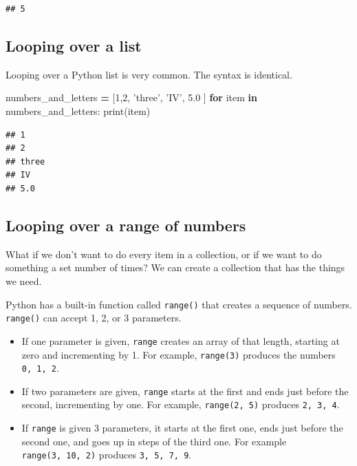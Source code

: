 \documentclass[]{book}
\newenvironment{Shaded}{\begin{snugshade}}{\end{snugshade}}
\newcommand{\BuiltInTok}[1]{#1}
\newcommand{\ControlFlowTok}[1]{\textcolor[rgb]{0.13,0.29,0.53}{\textbf{#1}}}
\newcommand{\DecValTok}[1]{\textcolor[rgb]{0.00,0.00,0.81}{#1}}
\newcommand{\FloatTok}[1]{\textcolor[rgb]{0.00,0.00,0.81}{#1}}
\newcommand{\KeywordTok}[1]{\textcolor[rgb]{0.13,0.29,0.53}{\textbf{#1}}}
\newcommand{\NormalTok}[1]{#1}
\newcommand{\OperatorTok}[1]{\textcolor[rgb]{0.81,0.36,0.00}{\textbf{#1}}}
\newcommand{\StringTok}[1]{\textcolor[rgb]{0.31,0.60,0.02}{#1}}
\providecommand{\tightlist}{%
  \setlength{\itemsep}{0pt}\setlength{\parskip}{0pt}}
\theoremstyle{definition}
\theoremstyle{definition}
\theoremstyle{definition}
\theoremstyle{remark}
\begin{document}
\begin{verbatim}
## 5
\end{verbatim}

\hypertarget{looping-over-a-list}{%
\subsection{Looping over a list}\label{looping-over-a-list}}

Looping over a Python list is very common. The syntax is identical.

\begin{Shaded}
\begin{Highlighting}[]
\NormalTok{numbers_and_letters }\OperatorTok{=}\NormalTok{ [}\DecValTok{1}\NormalTok{,}\DecValTok{2}\NormalTok{, }\StringTok{'three'}\NormalTok{, }\StringTok{'IV'}\NormalTok{, }\FloatTok{5.0}\NormalTok{ ]}
\ControlFlowTok{for}\NormalTok{ item }\KeywordTok{in}\NormalTok{ numbers_and_letters:}
    \BuiltInTok{print}\NormalTok{(item)}
\end{Highlighting}
\end{Shaded}

\begin{verbatim}
## 1
## 2
## three
## IV
## 5.0
\end{verbatim}

\hypertarget{looping-over-a-range-of-numbers}{%
\subsection{Looping over a range of
numbers}\label{looping-over-a-range-of-numbers}}

What if we don't want to do every item in a collection, or if we want to
do something a set number of times? We can create a collection that has
the things we need.

Python has a built-in function called \texttt{range()} that creates a
sequence of numbers. \texttt{range()} can accept 1, 2, or 3 parameters.

\begin{itemize}
\tightlist
\item
  If one parameter is given, \texttt{range} creates an array of that
  length, starting at zero and incrementing by 1. For example,
  \texttt{range(3)} produces the numbers \texttt{0,\ 1,\ 2}.
\item
  If two parameters are given, \texttt{range} starts at the first and
  ends just before the second, incrementing by one. For example,
  \texttt{range(2,\ 5)} produces \texttt{2,\ 3,\ 4}.
\item
  If \texttt{range} is given 3 parameters, it starts at the first one,
  ends just before the second one, and goes up in steps of the third
  one. For example \texttt{range(3,\ 10,\ 2)} produces
  \texttt{3,\ 5,\ 7,\ 9}.
\end{itemize}
\end{document}
